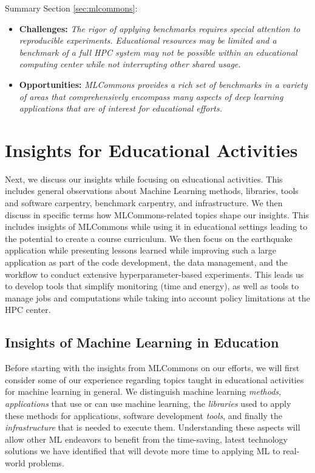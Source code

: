 \begin{tcolorbox}
Summary Section \ref{sec:mlcommons}:

\begin{itemize}
\item {\bf Challenges:} {\it The rigor of applying benchmarks requires special attention to reproducible experiments. Educational resources may be limited and a benchmark of a full HPC system may not be possible within an educational computing center while not interrupting other shared usage.}
\item {\bf Opportunities:} {\it MLCommons provides a rich set of benchmarks in a variety of areas that comprehensively encompass many aspects of deep learning applications that are of interest for educational efforts.}
\end{itemize}
\end{tcolorbox}


\section{Insights for Educational Activities}
\label{sed:edu}

Next, we discuss our insights while focusing on educational activities. This includes general observations about Machine Learning methods, libraries, tools and software carpentry, benchmark carpentry, and infrastructure. We then discuss in specific terms how MLCommons-related topics shape our insights. This includes insights of MLCommons while using it in educational settings leading to the potential to create a course curriculum. We then focus on the earthquake application while presenting lessons learned while improving such a large application as part of the code development, the data management, and the workflow to conduct extensive hyperparameter-based experiments. This leads us to develop tools that simplify monitoring (time and energy), as well as tools to manage jobs and computations while taking into account policy limitations at the HPC center.



\subsection{Insights of Machine Learning in Education}
\label{sec:edu-ml}

Before starting with the insights from MLCommons on our efforts, we will first consider some of our experience regarding topics taught in educational activities for machine learning in general. We distinguish machine learning {\em methods}, {\em applications} that use or can use machine learning, the {\em libraries} used to apply these methods for applications, software development {\em tools}, and finally the {\em
infrastructure} that is needed to execute them. Understanding these aspects will allow other ML endeavors to benefit from the time-saving, latest technology solutions we have identified that will devote more time to applying ML to real-world problems.

